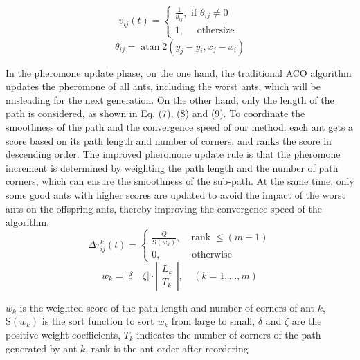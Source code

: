 \documentclass{iosart2c}
\begin{document}
\begin{equation} %
v_{i j}(t)=\left\{\begin{array}{l}
\frac{1}{\theta_{i j}}, \text { if } \theta_{i j} \neq 0 \\
1, \quad \text { othersize }\end{array}\right.
\end{equation}
\begin{equation} %
\theta_{i j}=\operatorname{atan} 2\left(y_{j}-y_{i},x_{j}-x_{i}\right)
\end{equation}

In the pheromone update phase, on the one hand, the traditional ACO algorithm updates the pheromone of all ants, including the worst ants, which will be misleading for the next generation. On the other hand, only the length of the path is considered, as shown in Eq. (7), (8) and (9). To coordinate the smoothness of the path and the convergence speed of our method. each ant gets a score based on its path length and number of corners, and ranks the score in descending order. The improved pheromone update rule is that the pheromone increment is determined by weighting the path length and the number of path corners, which can ensure the smoothness of the sub-path. At the same time, only some good ants with higher scores are updated to avoid the impact of the worst ants on the offspring ants, thereby improving the convergence speed of the algorithm.
\begin{equation} %
\Delta \tau_{i j}^{k}(t)=\left\{\begin{array}{cc}
\frac{Q}{\mathrm{S}\left(w_{k}\right)}, & \operatorname{rank} \leq(m-1) \\
0, & \text { otherwise }
\end{array}\right.
\end{equation}
\begin{equation} %
w_{k}=|\delta \quad \zeta| \cdot\left|\begin{array}{l}
L_{k} \\
T_{k}
\end{array}\right|, \quad(k=1, \ldots, m)
\end{equation}

$w_{k}$ is the weighted score of the path length and number of corners of ant $k$, $\mathrm{S}\left(w_{k}\right)$ is the sort function to sort $w_{k}$ from large to small, $\delta$ and $\zeta$ are the positive weight coefficients, $T_{k}$ indicates the number of corners of the path generated by ant $k$. $\mathrm{rank}$ is the ant order after reordering
\end{document}
